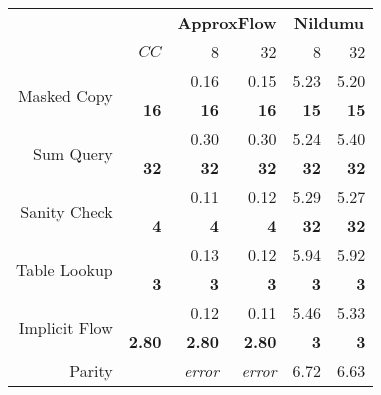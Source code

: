 \begin{figure}
\begin{table}[H]
\centering
\begin{tabular}{rr|rr|rr}
                                      & \textbf{}     & \multicolumn{2}{c|}{\textbf{ApproxFlow}}                 & \multicolumn{2}{c}{\textbf{Nildumu}}  \\
                                      & $CC$          & 8                      & 32                     & 8             & 32                   \\ \hline
\multirow{2}{*}{Masked Copy}          &               & 0.16                   & 0.15                   & 5.23          & 5.20                       \\
                                      & \textbf{16}   & \textbf{16}            & \textbf{16}            & \textbf{15}   & \textbf{15}       \\ \hline
\multirow{2}{*}{Sum Query}            &               & 0.30                   & 0.30                   & 5.24          & 5.40                        \\
                                      & \textbf{32}   & \textbf{32}            & \textbf{32}            & \textbf{32}   & \textbf{32}                 \\ \hline
\multirow{2}{*}{Sanity Check}         &               & 0.11                   & 0.12                   & 5.29          & 5.27                        \\
                                      & \textbf{4}    & \textbf{4}             & \textbf{4}             & \textbf{32}   & \textbf{32}                \\ \hline
\multirow{2}{*}{Table Lookup}         &               & 0.13                   & 0.12                   & 5.94          & 5.92                        \\
                                      & \textbf{3}    & \textbf{3}             & \textbf{3}             & \textbf{3}    & \textbf{3}                 \\ \hline
\multirow{2}{*}{Implicit Flow}        &               & 0.12                   & 0.11                   & 5.46          & 5.33                        \\
                                      & \textbf{2.80} & \textbf{2.80}          & \textbf{2.80}          & \textbf{3}    & \textbf{3}                  \\ \hline\hline
\multirow{2}{*}{Parity}               &               & \multirow{2}{*}{\textit{error\footnotemark[2]}} & \multirow{2}{*}{\textit{error}\footnotemark[2]} & 6.72          & 6.63       \\

\end{tabular}
\end{table}
\end{figure}
